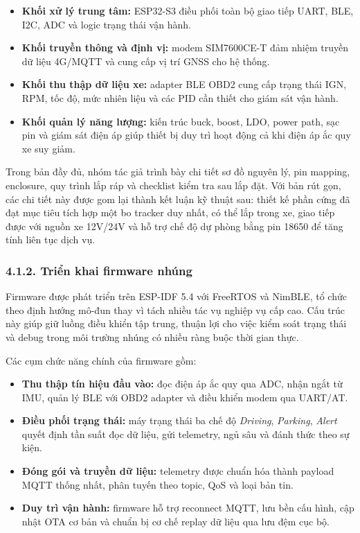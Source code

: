 \documentclass[a4paper]{extarticle}
\providecommand{\tightlist}{%
  \setlength{\itemsep}{0pt}\setlength{\parskip}{0pt}}
\begin{document}
\begin{itemize}
\tightlist
\item
  \textbf{Khối xử lý trung tâm:} ESP32-S3 điều phối toàn bộ giao tiếp UART, BLE, I2C, ADC và logic trạng thái vận hành.
\item
  \textbf{Khối truyền thông và định vị:} modem SIM7600CE-T đảm nhiệm truyền dữ liệu 4G/MQTT và cung cấp vị trí GNSS cho hệ thống.
\item
  \textbf{Khối thu thập dữ liệu xe:} adapter BLE OBD2 cung cấp trạng thái IGN, RPM, tốc độ, mức nhiên liệu và các PID cần thiết cho giám sát vận hành.
\item
  \textbf{Khối quản lý năng lượng:} kiến trúc buck, boost, LDO, power path, sạc pin và giám sát điện áp giúp thiết bị duy trì hoạt động cả khi điện áp ắc quy xe suy giảm.
\end{itemize}

Trong bản đầy đủ, nhóm tác giả trình bày chi tiết sơ đồ nguyên lý, pin mapping, enclosure, quy trình lắp ráp và checklist kiểm tra sau lắp đặt. Với bản rút gọn, các chi tiết này được gom lại thành kết luận kỹ thuật sau: thiết kế phần cứng đã đạt mục tiêu tích hợp một bo tracker duy nhất, có thể lắp trong xe, giao tiếp được với nguồn xe 12V/24V và hỗ trợ chế độ dự phòng bằng pin 18650 để tăng tính liên tục dịch vụ.

\subsubsection{4.1.2. Triển khai firmware nhúng}

Firmware được phát triển trên ESP-IDF 5.4 với FreeRTOS và NimBLE, tổ chức theo định hướng mô-đun thay vì tách nhiều tác vụ nghiệp vụ cấp cao. Cấu trúc này giúp giữ luồng điều khiển tập trung, thuận lợi cho việc kiểm soát trạng thái và debug trong môi trường nhúng có nhiều ràng buộc thời gian thực.

Các cụm chức năng chính của firmware gồm:

\begin{itemize}
\tightlist
\item
  \textbf{Thu thập tín hiệu đầu vào:} đọc điện áp ắc quy qua ADC, nhận ngắt từ IMU, quản lý BLE với OBD2 adapter và điều khiển modem qua UART/AT.
\item
  \textbf{Điều phối trạng thái:} máy trạng thái ba chế độ \emph{Driving}, \emph{Parking}, \emph{Alert} quyết định tần suất đọc dữ liệu, gửi telemetry, ngủ sâu và đánh thức theo sự kiện.
\item
  \textbf{Đóng gói và truyền dữ liệu:} telemetry được chuẩn hóa thành payload MQTT thống nhất, phân tuyến theo topic, QoS và loại bản tin.
\item
  \textbf{Duy trì vận hành:} firmware hỗ trợ reconnect MQTT, lưu bền cấu hình, cập nhật OTA cơ bản và chuẩn bị cơ chế replay dữ liệu qua lưu đệm cục bộ.
\end{itemize}
\end{document}
